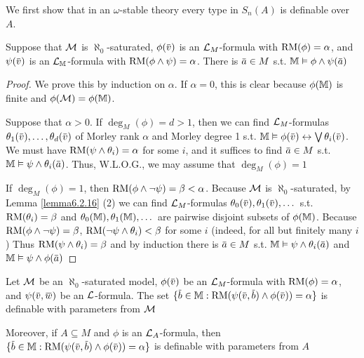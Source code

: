 \documentclass[11pt]{article}
\begin{document}
We first show that in an \(\omega\)-stable theory every type in \(S_n(A)\) is definable over \(A\).

\begin{lemma}[]
\label{lemma6.3.4}
Suppose that \(\mathcal{M}\) is \(\aleph_0\)-saturated, \(\phi(\barv)\) is an \(\mathcal{L}_M\)-formula with \(\operatorname{RM}(\phi)=\alpha\),
and \(\psi(\barv)\) is an \(\mathcal{L}_{\mathbb{M}}\)-formula with \(\operatorname{RM}(\phi\wedge\psi)=\alpha\). There is \(\bara\in M\) s.t. \(\M\vDash\phi\wedge\psi(\bara)\)
\end{lemma}

\begin{proof}
We prove this by induction on \(\alpha\). If \(\alpha=0\), this is clear because \(\phi(\mathbb{M})\)  is finite
and \(\phi(\mathcal{M})=\phi(\mathbb{M})\).

Suppose that \(\alpha>0\). If \(\deg_M(\phi)=d>1\), then we can
find \(\mathcal{L}_M\)-formulas \(\theta_1(\barv),\dots,\theta_d(\barv)\) of Morley rank \(\alpha\) and Morley degree 1
s.t. \(\M\vDash\phi(\barv)\leftrightarrow\bigvee\theta_i(\barv)\). We must have \(\operatorname{RM}(\psi\wedge\theta_i)=\alpha\) for some \(i\), and it suffices to
find \(\bara\in M\) s.t. \(\M\vDash\psi\wedge\theta_i(\bara)\). Thus, W.L.O.G., we may assume that \(\deg_M(\phi)=1\)

If \(\deg_M(\phi)=1\), then \(\operatorname{RM}(\phi\wedge\neg\psi)=\beta<\alpha\). Because \(\mathcal{M}\) is \(\aleph_0\)-saturated, by Lemma
\ref{lemma6.2.16} (2) we can find \(\mathcal{L}_M\)-formulas \(\theta_0(\barv),\theta_1(\barv),\dots\) s.t. \(\operatorname{RM}(\theta_i)=\beta\)
and \(\theta_0(\mathbb{M}),\theta_1(\mathbb{M}),\dots\) are pairwise disjoint subsets of \(\phi(\mathbb{M})\).
Because \(\operatorname{RM}(\phi\wedge\neg\psi)=\beta\), \(\operatorname{RM}(\neg\psi\wedge\theta_i)<\beta\) for some \(i\) (indeed, for all but finitely
many \(i\))
Thus \(\operatorname{RM}(\psi\wedge\theta_i)=\beta\) and by induction there is \(\bara\in M\) s.t. \(\M\vDash\psi\wedge\theta_i(\bara)\) and \(\M\vDash\psi\wedge\phi(\bara)\)
\end{proof}

\begin{theorem}[]
\label{thm6.3.5}
Let \(\mathcal{M}\) be an \(\aleph_0\)-saturated model, \(\phi(\barv)\) be an \(\mathcal{L}_M\)-formula with \(\operatorname{RM}(\phi)=\alpha\),
and \(\psi(\barv,\barw)\) be an \(\mathcal{L}\)-formula. The set \(\{\barb\in\M:\RM(\psi(\barv,\barb)\wedge\phi(\barv))=\alpha\}\)
is definable with parameters from \(\mathcal{M}\)

Moreover, if \(A\subseteq M\) and \(\phi\) is an \(\mathcal{L}_A\)-formula,
then \(\{\barb\in\M:\RM(\psi(\barv,\barb)\wedge\phi(\barv))=\alpha\}\) is definable with parameters from \(A\)
\end{theorem}
\end{document}
